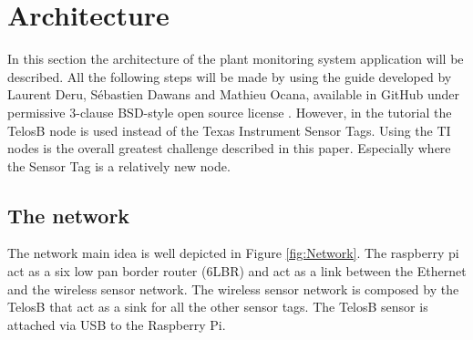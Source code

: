 \section{Architecture}
In this section the architecture of the plant monitoring system application will be described. All the following steps will be made by using the guide developed by Laurent Deru, Sébastien Dawans and Mathieu Ocana, available in GitHub under permissive 3-clause BSD-style open source license \cite{6lbr}. However, in the tutorial the TelosB node is used instead of the Texas Instrument Sensor Tags. Using the TI nodes is the overall greatest challenge described in this paper. Especially where the Sensor Tag is a relatively new node.\\
\subsection{The network}
The network main idea is well depicted in Figure \ref{fig:Network}. The raspberry pi act as a six low pan border router (6LBR) and act as a link between the Ethernet and the wireless sensor network. The wireless sensor network is composed by the TelosB that act as a sink for all the other sensor tags. The TelosB sensor is attached via USB to the Raspberry Pi.
